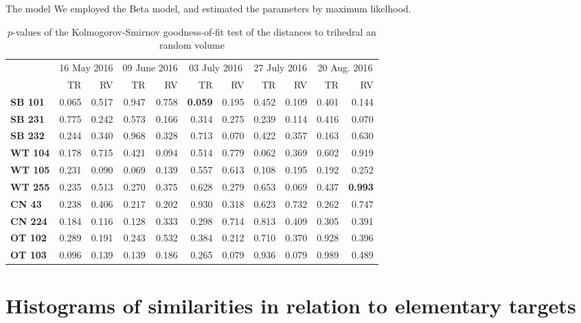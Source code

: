 \documentclass[10pt]{beamer}
\begin{document}
\begin{frame}{The model}
We employed the Beta model, and estimated the parameters by maximum likelhood.

\begin{table}[hbt]
	\centering
	\caption{$p$-values of the Kolmogorov-Smirnov goodness-of-fit test of the distances to trihedral an random volume}\label{tab:pvalues_table}
{\tiny 	\begin{tabular}{lrrrrrrrrrr}
		\toprule
		& \multicolumn{2}{c}{16 May 2016} & \multicolumn{2}{c}{09 June 2016} & \multicolumn{2}{c}{03 July 2016} & \multicolumn{2}{c}{27 July 2016} & \multicolumn{2}{c}{20 Aug. 2016}\\
		& TR & RV & TR & RV & TR & RV & TR & RV& TR & RV\\
		\cmidrule(lr){2-11}
		\textbf{SB 101} & 0.065 & 0.517 & 0.947 & 0.758 & \textbf{0.059} & 0.195 & 0.452 & 0.109 & 0.401 & 0.144\\
		\textbf{SB 231} & 0.775 & 0.242 & 0.573 & 0.166 & 0.314 & 0.275 & 0.239 & 0.114 & 0.416 & 0.070\\
		\textbf{SB 232} & 0.244 & 0.340 & 0.968 & 0.328 & 0.713 & 0.070 & 0.422 & 0.357 & 0.163 & 0.630\\
		\textbf{WT 104} & 0.178 & 0.715 & 0.421 & 0.094 & 0.514 & 0.779 & 0.062 & 0.369 & 0.602 & 0.919\\
		\textbf{WT 105} & 0.231 & 0.090 & 0.069 & 0.139 & 0.557 & 0.613 & 0.108 & 0.195 & 0.192 & 0.252\\
		\textbf{WT 255} & 0.235 & 0.513 & 0.270 & 0.375 & 0.628 & 0.279 & 0.653 & 0.069 & 0.437 & \textbf{0.993}\\
		\textbf{CN 43}  & 0.238 & 0.406 & 0.217 & 0.202 & 0.930 & 0.318 & 0.623 & 0.732 & 0.262 & 0.747\\
		\textbf{CN 224} & 0.184 & 0.116 & 0.128 & 0.333 & 0.298 & 0.714 & 0.813 & 0.409 & 0.305 & 0.391\\
		\textbf{OT 102} & 0.289 & 0.191 & 0.243 & 0.532 & 0.384 & 0.212 & 0.710 & 0.370 & 0.928 & 0.396\\
		\textbf{OT 103} & 0.096 & 0.139 & 0.139 & 0.186 & 0.265 & 0.079 & 0.936 & 0.079 & 0.989 & 0.489\\
		\bottomrule
	\end{tabular}}
\end{table}
\end{frame}


\section[Histograms]{Histograms of similarities in relation to elementary targets}
\end{document}

